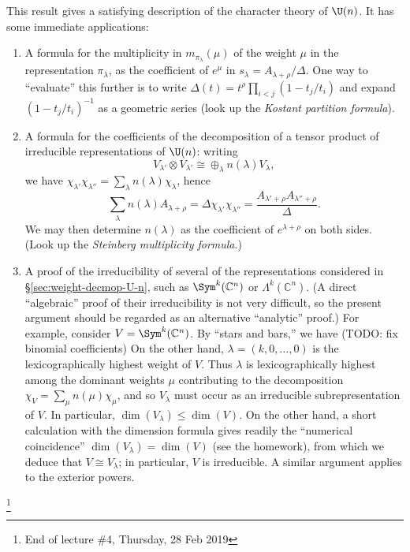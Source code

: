 \documentclass[reqno]{amsart} 
\begin{document}
This result gives a satisfying description of the character theory of $\U(n)$.  It has some immediate applications:
\begin{enumerate}
\item A formula for the multiplicity in $m_{\pi_\lambda}(\mu)$ of the weight $\mu$ in the representation $\pi_\lambda$, as the coefficient of $e^\mu$ in $s_\lambda = A_{\lambda + \rho}/\Delta$.  One way to ``evaluate'' this further is to write $\Delta(t) = t^\rho \prod_{i < j} (1 - t_j/t_i)$ and expand $(1 - t_j/t_i)^{-1}$ as a geometric series (look up the \emph{Kostant partition formula}).
\item A formula for the coefficients of the decomposition of a tensor product of irreducible representations of $\U(n)$: writing
  \begin{equation*}
    V_{\lambda '}
    \otimes V_{\lambda '}
    \cong \oplus_{\lambda}
    n(\lambda) V_{\lambda},
  \end{equation*}
  we have $\chi_{\lambda '} \chi_{\lambda ''} = \sum_{\lambda} n(\lambda) \chi_\lambda$, hence
  \begin{equation*}
    \sum_{\lambda} n(\lambda) A_{\lambda+\rho} = \Delta \chi_{\lambda '} \chi_{\lambda ''} = \frac{A_{\lambda ' + \rho} A_{\lambda '' + \rho}}{\Delta }.
  \end{equation*}
  We may then determine $n(\lambda)$ as the coefficient of $e^{\lambda+\rho}$ on both sides.  (Look up the \emph{Steinberg multiplicity formula}.)
\item A proof of the irreducibility of several of the representations considered in \S\ref{sec:weight-decmop-U-n}, such as $\Sym^k(\mathbb{C}^n)$ or $\Lambda^k(\mathbb{C}^n)$.  (A direct ``algebraic'' proof of their irreducibility is not very difficult, so the present argument should be regarded as an alternative ``analytic'' proof.)  For example, consider $V = \Sym^k(\mathbb{C}^n)$.  By ``stars and bars,'' we have (TODO: fix binomial coefficients)
  On the other hand, $\lambda = (k,0,\dotsc,0)$ is the lexicographically highest weight of $V$.  Thus $\lambda$ is lexicographically highest among the dominant weights $\mu$ contributing to the decomposition $\chi_V = \sum_{\mu} n(\mu) \chi_\mu$, and so $V_\lambda$ must occur as an irreducible subrepresentation of $V$.  In particular, $\dim(V_\lambda) \leq \dim(V)$.  On the other hand, a short calculation with the dimension formula gives readily the ``numerical coincidence'' $\dim(V_\lambda) = \dim(V)$ (see the homework), from which we deduce that $V \cong V_\lambda$; in particular, $V$ is irreducible.  A similar argument applies to the exterior powers.
\end{enumerate}
\footnote{End of lecture \#4, Thursday, 28 Feb 2019}
\end{document}
